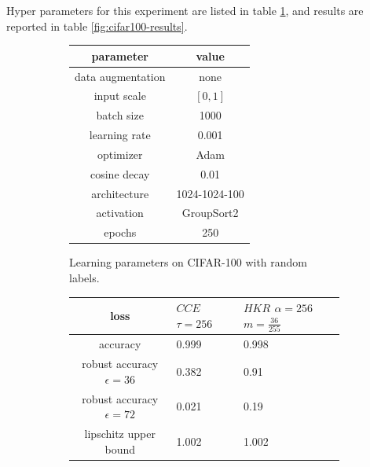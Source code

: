     Hyper parameters for this experiment are listed in table \ref{fig:cifar100-lp}, and results are reported in table \ref{fig:cifar100-results}.
    
    \begin{figure}
        \centering
        \begin{subfigure}[b]{0.30\textwidth}
            \small
            \centering
            \begin{tabular}{cc}
                \hline
                parameter & value \\
                \hline
                data augmentation & none \\
                input scale & $[0,1]$ \\
                batch size & 1000 \\
                learning rate & 0.001 \\
                optimizer & Adam \\
                cosine decay & 0.01 \\
                architecture & 1024-1024-100 \\
                activation & GroupSort2 \\
                epochs &  250 \\
                \hline
            \end{tabular}
            \caption{Learning parameters on CIFAR-100 with random labels.}
            \label{fig:cifar100-lp}
        \end{subfigure}
        \hfill
        \begin{subfigure}[b]{0.60\textwidth}
            \small
            \centering
            \begin{tabular}{cp{1.5cm}p{1.5cm}}
                \hline
                loss & $CCE$ \newline $\tau=256$ & $HKR$ \newline $\alpha=256$ \newline $m=\frac{36}{255}$ \\
                \hline
                accuracy & 0.999 & 0.998 \\
                robust accuracy $\epsilon=36$ & 0.382 & 0.91 \\
                robust accuracy $\epsilon=72$ & 0.021 & 0.19 \\
                lipschitz upper bound &  1.002 & 1.002 \\

\end{tabular}
\end{subfigure}
\end{figure}
